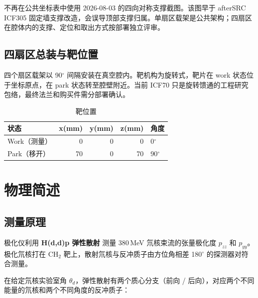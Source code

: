 \documentclass[UTF8,10pt,letterpaper,fontset=none]{ctexart}
\begin{document}
\begin{tcolorbox}[colback=SheetLight,colframe=SheetBlue!30,boxsep=3pt,left=7pt,right=7pt,top=3pt,bottom=3pt]
\sffamily\scriptsize\color{SheetMuted}
不再在公共坐标表中使用 2026-08-03 的四向对称支撑截图。该图早于 afterSRC ICF305 固定墙支撑改造，会误导顶部支撑归属。单扇区载架是公共架构；四扇区在腔体内的支撑、定位和取出方式按部署独立评审。
\end{tcolorbox}

\subsection{四扇区总装与靶位置}

四个扇区载架以 90$^\circ$ 间隔安装在真空腔内。靶机构为旋转式，靶片在 work 状态位于坐标原点，在 park 状态转至腔壁附近。当前 ICF70 只是旋转馈通的工程研究包络，最终法兰和购买件需分部署确认。

\begin{table}[h]
\centering
\sffamily\small
\caption{靶位置}
\label{tab:target}
\renewcommand{\arraystretch}{1.2}
\begin{tabular}{lrrr l}
\toprule
\textbf{状态} & \textbf{x}(mm) & \textbf{y}(mm) & \textbf{z}(mm) & \textbf{角度} \\
\midrule
Work（测量）  & 0 & 0 & 0 & 0$^\circ$ \\
Park（移开）  & 70 & 0 & 70 & 90$^\circ$ \\
\bottomrule
\end{tabular}
\end{table}

\section{物理简述}\label{sec:physics}

\subsection{测量原理}

极化仪利用 \textbf{H(d,d)p 弹性散射} 测量 380\,MeV 氘核束流的张量极化度 $p_{zz}$ 和 $p_{yy}$。极化氘核打在 CH$_2$ 靶上，散射氘核与反冲质子由方位角相差 180$^\circ$ 的探测器对符合测量。

在给定氘核实验室角 $\theta_d$，弹性散射有两个质心分支（前向 / 后向），对应两个不同能量的氘核和两个不同角度的反冲质子：
\end{document}
